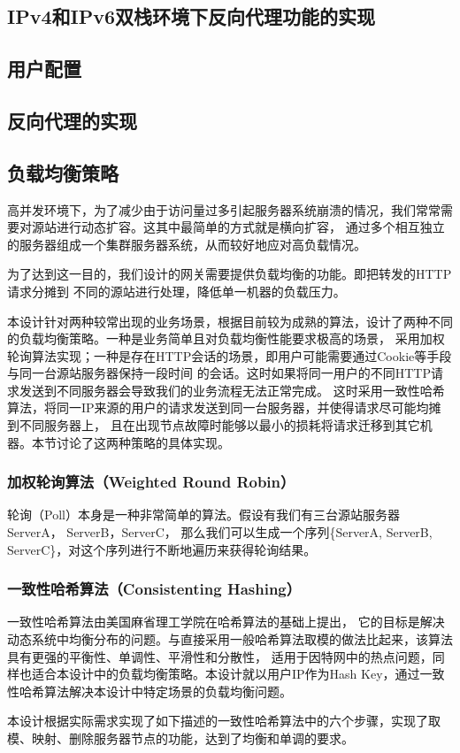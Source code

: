 \documentclass[twoside]{CUGThesis}
\begin{document}
	

	\begin{spacing}{2}
		\section{IPv4和IPv6双栈环境下反向代理功能的实现}
	\end{spacing}
	\subsection{用户配置}
	\subsection{反向代理的实现}
	\subsection{负载均衡策略}
	高并发环境下，为了减少由于访问量过多引起服务器系统崩溃的情况，我们常常需要对源站进行动态扩容。这其中最简单的方式就是横向扩容，
	通过多个相互独立的服务器组成一个集群服务器系统，从而较好地应对高负载情况。\par 
	为了达到这一目的，我们设计的网关需要提供负载均衡的功能。即把转发的HTTP请求分摊到
	不同的源站进行处理，降低单一机器的负载压力。\par
	本设计针对两种较常出现的业务场景，根据目前较为成熟的算法，设计了两种不同的负载均衡策略。一种是业务简单且对负载均衡性能要求极高的场景，
	采用加权轮询算法实现；一种是存在HTTP会话的场景，即用户可能需要通过Cookie等手段与同一台源站服务器保持一段时间
	的会话。这时如果将同一用户的不同HTTP请求发送到不同服务器会导致我们的业务流程无法正常完成。
	这时采用一致性哈希算法，将同一IP来源的用户的请求发送到同一台服务器，并使得请求尽可能均摊到不同服务器上，
	且在出现节点故障时能够以最小的损耗将请求迁移到其它机器。本节讨论了这两种策略的具体实现。\par 
	
	\subsubsection{加权轮询算法（Weighted Round Robin）}
	轮询（Poll）本身是一种非常简单的算法。假设有我们有三台源站服务器ServerA， ServerB，ServerC，
	那么我们可以生成一个序列\{ServerA, ServerB, ServerC\}，对这个序列进行不断地遍历来获得轮询结果。\par 
	
	\subsubsection{一致性哈希算法（Consistenting Hashing）}
	一致性哈希算法由美国麻省理工学院在哈希算法的基础上提出\cite{karger1997consistent}，
	它的目标是解决动态系统中均衡分布的问题。与直接采用一般哈希算法取模的做法比起来，该算法具有更强的平衡性、单调性、平滑性和分散性，
	适用于因特网中的热点问题，同样也适合本设计中的负载均衡策略。本设计就以用户IP作为Hash Key，通过一致性哈希算法解决本设计中特定场景的负载均衡问题。\par 
	本设计根据实际需求实现了如下描述的一致性哈希算法中的六个步骤，实现了取模、映射、删除服务器节点的功能，达到了均衡和单调的要求。\par
\end{document}
